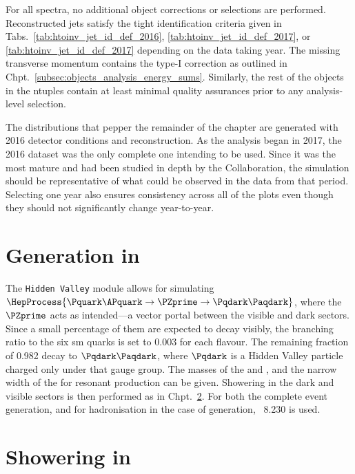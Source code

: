 For all spectra, no additional object corrections or selections are performed. Reconstructed \glspl{jet} satisfy the tight identification criteria given in Tabs.~\ref{tab:htoinv_jet_id_def_2016}, \ref{tab:htoinv_jet_id_def_2017}, or \ref{tab:htoinv_jet_id_def_2017} depending on the data taking year. The missing transverse momentum \ptmiss contains the type-I correction as outlined in Chpt.~\ref{subsec:objects_analysis_energy_sums}. Similarly, the rest of the objects in the ntuples contain at least minimal quality assurances prior to any analysis-level selection.

The distributions that pepper the remainder of the chapter are generated with 2016 detector conditions and reconstruction. As the analysis began in 2017, the 2016 dataset was the only complete one intending to be used. Since it was the most mature and had been studied in depth by the Collaboration, the simulation should be representative of what could be observed in the data from that period. Selecting one year also ensures consistency across all of the plots even though they should not significantly change year-to-year.




\section{Generation in \texorpdfstring{\PYTHIA}{Pythia}}
\label{sec:svj_signal_pythia}

The \texttt{Hidden Valley} module allows for simulating $\HepProcess{\Pquark\APquark \to \PZprime \to \Pqdark\Paqdark}$, where the $\PZprime$ acts as intended---a vector portal between the visible and dark sectors. Since a small percentage of them are expected to decay visibly, the branching ratio to the six \acrshort{sm} quarks is set to 0.003 for each flavour. The remaining fraction of 0.982 decay to $\Pqdark\Paqdark$, where $\Pqdark$ is a Hidden Valley particle charged only under that gauge group. The masses of the \PZprime and \Pqdark, and the narrow width of the \PZprime for resonant production can be given. Showering in the dark and visible sectors is then performed as in Chpt.~\ref{sec:svj_showering_pythia}. For both the complete event generation, and for hadronisation in the case of \MADGRAPH generation, \PYTHIA~8.230 is used.




\section{Showering in \texorpdfstring{\PYTHIA}{Pythia}}
\label{sec:svj_showering_pythia}

